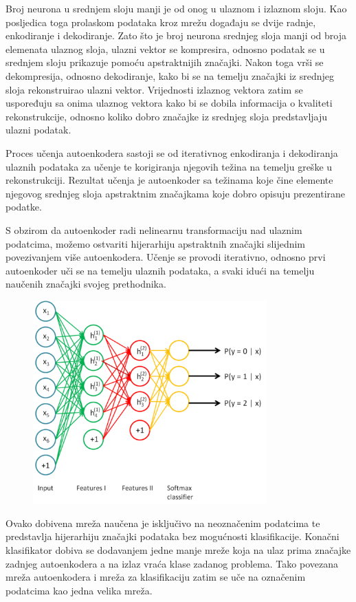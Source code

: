 \documentclass[lmodern, utf8, diplomski, numeric]{fer}
\begin{document}
Broj neurona u srednjem sloju manji je od onog u ulaznom i izlaznom sloju. Kao posljedica toga prolaskom podataka kroz mrežu događaju se dvije radnje, enkodiranje i dekodiranje. Zato što je broj neurona srednjeg sloja manji od broja elemenata ulaznog sloja, ulazni vektor se kompresira, odnosno podatak se u srednjem sloju prikazuje pomoću apstraktnijih značajki. Nakon toga vrši se dekompresija, odnosno dekodiranje, kako bi se na temelju značajki iz srednjeg sloja rekonstruirao ulazni vektor.
Vrijednosti izlaznog vektora zatim se uspoređuju sa onima ulaznog vektora kako bi se dobila informacija o kvaliteti rekonstrukcije, odnosno koliko dobro značajke iz srednjeg sloja predstavljaju ulazni podatak.

Proces učenja autoenkodera sastoji se od iterativnog enkodiranja i dekodiranja ulaznih podataka za učenje te korigiranja njegovih težina na temelju greške u rekonstrukciji. Rezultat učenja je autoenkoder sa težinama koje čine elemente njegovog srednjeg sloja apstraktnim značajkama koje dobro opisuju prezentirane podatke. 

S obzirom da autoenkoder radi nelinearnu transformaciju nad ulaznim podatcima, možemo ostvariti hijerarhiju apstraktnih značajki slijednim povezivanjem više autoenkodera. Učenje se provodi iterativno, odnosno prvi autoenkoder uči se na temelju ulaznih podataka, a svaki idući na temelju naučenih značajki svojeg prethodnika. 

\begin{figure}[ht!]
\centering
\includegraphics[width=9cm]{slike/stacked_autoencoders.png}
\caption{}
\end{figure}

Ovako dobivena mreža naučena je isključivo na neoznačenim podatcima te predstavlja hijerarhiju značajki podataka bez mogućnosti klasifikacije. Konačni klasifikator dobiva se dodavanjem jedne manje mreže koja na ulaz prima značajke zadnjeg autoenkodera a na izlaz vraća klase zadanog problema. Tako povezana mreža autoenkodera i mreža za klasifikaciju zatim se uče na označenim podatcima kao jedna velika mreža.
\end{document}
